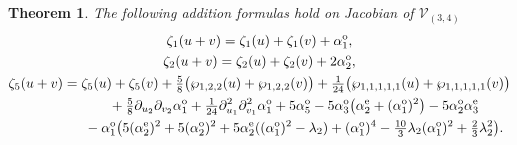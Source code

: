 \documentclass[pdftex]{sigma}
\numberwithin{equation}{section}
\newtheorem{Theorem}{Theorem}[section]
\begin{document}
\begin{Theorem}\label{T:AddF}The following addition formulas hold on Jacobian of $\mathcal{V}_{(3,4)}$
\begin{gather}
 \zeta_1(u+v) = \zeta_1(u) + \zeta_1(v) + \alpha_1^{{\rm o}},\nonumber\\
 \zeta_2(u+v) = \zeta_2(u)+\zeta_2(v) + 2\alpha_2^{{\rm o}},\nonumber\\
 \zeta_5(u+v) = \zeta_5(u)+\zeta_5(v) + \tfrac{5}{8} \big( \wp_{1,2,2}(u) + \wp_{1,2,2}(v)\big) + \tfrac{1}{24}\big(\wp_{1,1,1,1,1}(u) + \wp_{1,1,1,1,1}(v) \big) \nonumber\\
\hphantom{\zeta_5(u+v) =}{} + \tfrac{5}{8} \partial_{u_2}\partial_{v_2} \alpha_1^{{\rm o}}
 + \tfrac{1}{24} \partial_{u_1}^2\partial_{v_1}^2 \alpha_1^{{\rm o}} + 5\alpha_5^{{\rm o}} - 5 \alpha_3^{{\rm o}} \big(\alpha_2^{{\rm e}} + (\alpha_1^{{\rm o}})^2 \big) - 5 \alpha_2^{{\rm o}} \alpha_3^{{\rm e}} \nonumber\\
\hphantom{\zeta_5(u+v) =}{} - \alpha_1^{{\rm o}} \big(5(\alpha_2^{{\rm e}})^2 + 5(\alpha_2^{{\rm o}})^2 + 5 \alpha_2^{{\rm e}} ((\alpha_1^{{\rm o}})^2-\lambda_2)
 + (\alpha_1^{{\rm o}})^4 -\tfrac{10}{3} \lambda_2 (\alpha_1^{{\rm o}})^2 + \tfrac{2}{3}\lambda_2^2\big).\label{ZetaAddF}
\end{gather}
\end{Theorem}
\end{document}
